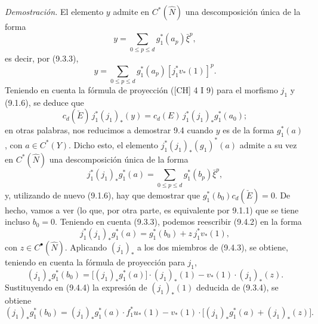 \emph{Demostración.} El elemento $y$ admite en $C^*(\widehat N)$ una descomposición única de la forma
\[
y=\sum_{0\le p\le d}g_1^*(a_p)\bar\xi^p,
\]
es decir, por (9.3.3),
\[
y=\sum_{0\le p\le d}g_1^*(a_p)[j_1^*v_*(1)]^p.
\tag{9.4.1}
\]
Teniendo en cuenta la fórmula de proyección ([CH] 4 I 9) para el morfismo $j_1$ y (9.1.6), se deduce que
\[
c_d(\check E)\,j_1^*(j_1)_*(y)=c_d(E)\,j_1^*(j_1)_*g_1^*(a_0);
\]
en otras palabras, nos reducimos a demostrar 9.4 cuando $y$ es de la forma $g_1^*(a)$, con $a\in C^*(Y)$. Dicho esto, el elemento $j_1^*(j_1)_*(g_1)^*(a)$ admite a su vez en $C^*(\widehat N)$ una descomposición única de la forma
\[
j_1^*(j_1)_*g_1^*(a)=\sum_{0\le p\le d}g_1^*(b_p)\bar\xi^p,
\tag{9.4.2}
\]
y, utilizando de nuevo (9.1.6), hay que demostrar que $g_1^*(b_0)c_d(\check E)=0$. De hecho, vamos a ver (lo que, por otra parte, es equivalente por 9.1.1) que se tiene incluso $b_0=0$. Teniendo en cuenta (9.3.3), podemos reescribir (9.4.2) en la forma
\[
j_1^*(j_1)_*g_1^*(a)=g_1^*(b_0)+z\,j_1^*v_*(1),
\tag{9.4.3}
\]
con $z\in C^{\bullet}(\widehat N)$. Aplicando $(j_1)_*$ a los dos miembros de (9.4.3), se obtiene, teniendo en cuenta la fórmula de proyección para $j_1$,
\[
(j_1)_*g_1^*(b_0)=\bigl[(j_1)_*g_1^*(a)\bigr]\cdot(j_1)_*(1)-v_*(1)\cdot(j_1)_*(z).
\tag{9.4.4}
\]
Sustituyendo en (9.4.4) la expresión de $(j_1)_*(1)$ deducida de (9.3.4), se obtiene
\[
(j_1)_*g_1^*(b_0)=
(j_1)_*g_1^*(a)\cdot f_1^*u_*(1)-v_*(1)\cdot\bigl[(j_1)_*g_1^*(a)+(j_1)_*(z)\bigr].
\tag{9.4.5}
\]
